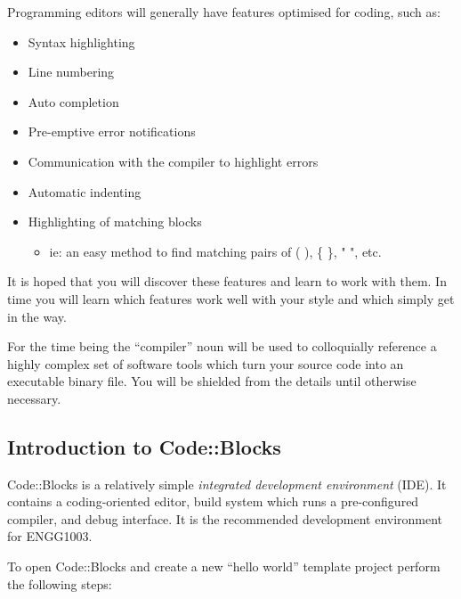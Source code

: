\documentclass{lab}
\begin{document}
Programming editors will generally have features optimised for coding, such as:

\begin{itemize}
\item Syntax highlighting
\item Line numbering
\item Auto completion
\item Pre-emptive error notifications
\item Communication with the compiler to highlight errors
\item Automatic indenting
\item Highlighting of matching blocks 
	\begin{itemize}
		\item ie: an easy method to find matching pairs of ( ), \{ \}, " ", etc.
	\end{itemize}
\end{itemize}

It is hoped that you will discover these features and learn to work with them. In time you will learn which features work well with your style and which simply get in the way.

For the time being the ``compiler'' noun will be used to colloquially reference a highly complex set of software tools which turn your source code into an executable binary file. You will be shielded from the details until otherwise necessary.

\pagebreak
\subsection{Introduction to Code::Blocks}

Code::Blocks is a relatively simple \textit{integrated development environment} (IDE). It contains a coding-oriented editor, build system which runs a pre-configured compiler, and debug interface. It is the recommended development environment for ENGG1003.

To open Code::Blocks and create a new ``hello world'' template project perform the following steps:
\end{document}
